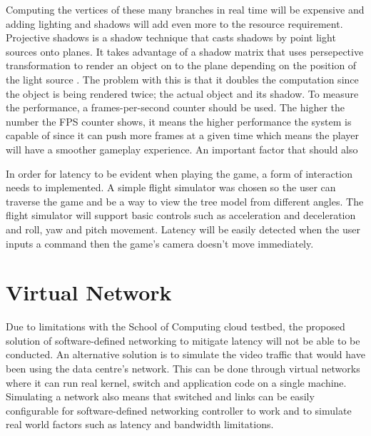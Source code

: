 Computing the vertices of these many branches in real time will be expensive and adding lighting and shadows will add even more to the resource requirement. Projective shadows is a shadow technique that casts shadows by point light sources onto planes. It takes advantage of a shadow matrix that uses persepective transformation to render an object on to the plane depending on the position of the light source \cite{hawkins2001opengl}. The problem with this is that it doubles the computation since the object is being rendered twice; the actual object and its shadow. To measure the performance, a frames-per-second counter should be used. The higher the number the FPS counter shows, it means the higher performance the system is capable of since it can push more frames at a given time which means the player will have a smoother gameplay experience. An important factor that should also 
\newline
\par
In order for latency to be evident when playing the game, a form of interaction needs to implemented. A simple flight simulator was chosen so the user can traverse the game and be a way to view the tree model from different angles. The flight simulator will support basic controls such as acceleration and deceleration and roll, yaw and pitch movement. Latency will be easily detected when the user inputs a command then the game's camera doesn't move immediately.

\section{Virtual Network}
Due to limitations with the School of Computing cloud testbed, the proposed solution of software-defined networking to mitigate latency will not be able to be conducted. An alternative solution is to simulate the video traffic that would have been using the data centre's network. This can be done through virtual networks where it can run real kernel, switch and application code on a single machine. Simulating a network also means that switched and links can be easily configurable for software-defined networking controller to work and to simulate real world factors such as latency and bandwidth limitations.

